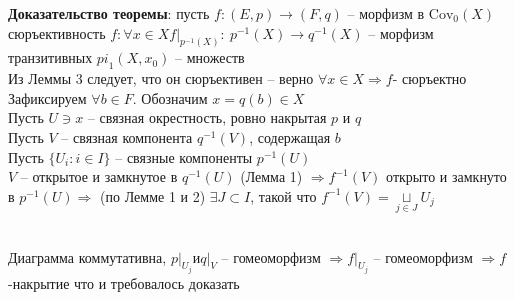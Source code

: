 	\textbf{Доказательство теоремы}: пусть $f: (E,p) \rightarrow (F,q)$ -- морфизм в $\text{Cov}_0 (X)$\\
	сюръективность $f: \forall x\in X {f|}_{p^{-1} (X)}:\ p^{-1} (X) \rightarrow q^{-1} (X)$ -- морфизм транзитивных ${pi}_1 (X,x_0)$ -- множеств\\
	Из Леммы 3 следует, что он сюръективен -- верно $\forall x\in X \Rightarrow f$- сюръектно\\
	Зафиксируем $\forall b\in F$. Обозначим $x = q(b) \in X$\\
	Пусть $U\ni x$ -- связная окрестность, ровно накрытая $p$ и $q$\\
	Пусть $V$ -- связная компонента $q^{-1} (V)$, содержащая $b$\\
	Пусть $\{ U_i: i\in I\}$ -- связные компоненты $p^{-1} (U)$\\
	$V$ -- открытое и замкнутое в $q^{-1} (U)$ (Лемма 1) $\Rightarrow f^{-1} (V)$ открыто и замкнуто в $p^{-1} (U) \Rightarrow$ (по Лемме 1 и 2) $\exists J\subset I$, такой что $f^{-1} (V) = \underset{j\in J}{\sqcup} U_j$\\
	\begin{figure}[h]
	\end{figure}\\
	Диаграмма коммутативна, ${p|}_{U_j} и {q|}_V$ -- гомеоморфизм $\Rightarrow {f|}_{U_j}$ -- гомеоморфизм $\Rightarrow f$ -накрытие что и требовалось доказать
	


\newpage
